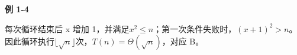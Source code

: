 {\color{ink}\bfseries 例 1-4}\par\vspace{1bp}每次循环结束后 x 增加 1，并满足\(x^{2}\le n\)；第一次条件失败时，\((x+\allowbreak{}1)^{2}>\allowbreak{}n\)。因此循环执行\(\lfloor \sqrt{n}\rfloor \)次，\(T(n)=\allowbreak{}\Theta (\sqrt{n})\)，对应 B。
